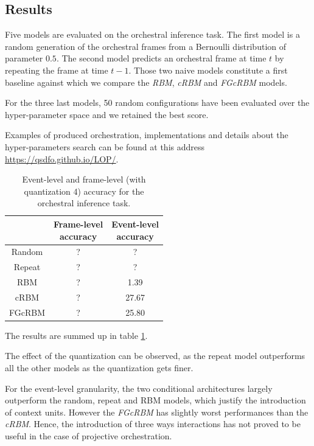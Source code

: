 \documentclass{article}
\begin{document}
\subsection{Results}
\label{sec:results}
Five models are evaluated on the orchestral inference task. The first model is a random generation of the orchestral frames from a Bernoulli distribution of parameter $0.5$. The second model predicts an orchestral frame at time $t$ by repeating the frame at time $t-1$. Those two naive models constitute a first baseline against which we compare the \textit{RBM}, \textit{cRBM} and \textit{FGcRBM} models.

For the three last models, 50 random configurations have been evaluated over the hyper-parameter space and we retained the best score. 

Examples of produced orchestration, implementations and details about the hyper-parameters search can be found at this address \url{https://qsdfo.github.io/LOP/}.

\begin{table}[h]
	\centering
	\begin{tabular}{c c c}
		\hline
		\thead{Model} & \thead{Frame-level\\ accuracy} & \thead{Event-level\\ accuracy} \\
		\hline
		Random & ? & ?\\ 
		Repeat & ? & ?\\
		\hline \hline
		RBM & ? & 1.39\\ 
		cRBM & ? & 27.67\\ 
		FGcRBM & ? & 25.80\\ 
	\end{tabular}
	\caption{Event-level and frame-level (with quantization 4) accuracy for the orchestral inference task.}
	\label{tab:result_event_level}
\end{table}
The results are summed up in table \ref{tab:result_event_level}.

The effect of the quantization can be observed, as the repeat model outperforms all the other models as the quantization gets finer.

For the event-level granularity, the two conditional architectures largely outperform the random, repeat and RBM models, which justify the introduction of context units.
However the \textit{FGcRBM} has slightly worst performances than the \textit{cRBM}.
Hence, the introduction of three ways interactions has not proved to be useful in the case of projective orchestration.
\end{document}

